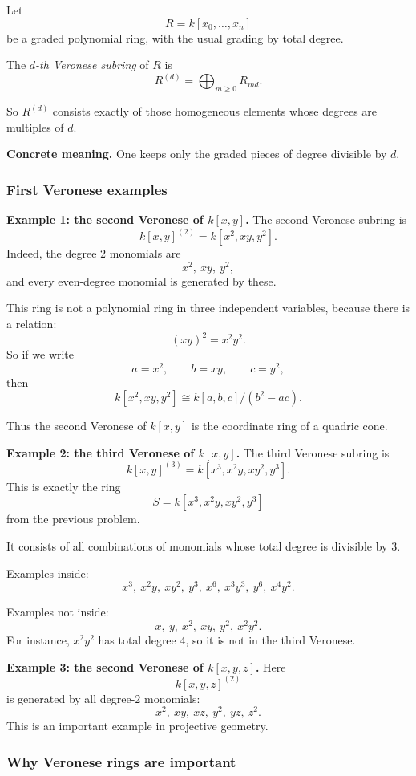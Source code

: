 \documentclass[12pt,a4paper]{article}
\theoremstyle{notespace}
\begin{document}
Let
\[
R=k[x_0,\dots,x_n]
\]
be a graded polynomial ring, with the usual grading by total degree.

The \emph{\(d\)-th Veronese subring} of \(R\) is
\[
R^{(d)}=\bigoplus_{m\ge 0} R_{md}.
\]

So \(R^{(d)}\) consists exactly of those homogeneous elements whose degrees are multiples of \(d\).

\medskip

\textbf{Concrete meaning.}
One keeps only the graded pieces of degree divisible by \(d\).

\subsubsection{First Veronese examples}

\textbf{Example 1: the second Veronese of \(k[x,y]\).}
The second Veronese subring is
\[
k[x,y]^{(2)}=k[x^2,xy,y^2].
\]
Indeed, the degree \(2\) monomials are
\[
x^2,\ xy,\ y^2,
\]
and every even-degree monomial is generated by these.

This ring is not a polynomial ring in three independent variables, because there is a relation:
\[
(xy)^2=x^2y^2.
\]
So if we write
\[
a=x^2,\qquad b=xy,\qquad c=y^2,
\]
then
\[
k[x^2,xy,y^2]\cong k[a,b,c]/(b^2-ac).
\]

Thus the second Veronese of \(k[x,y]\) is the coordinate ring of a quadric cone.

\medskip

\textbf{Example 2: the third Veronese of \(k[x,y]\).}
The third Veronese subring is
\[
k[x,y]^{(3)}=k[x^3,x^2y,xy^2,y^3].
\]
This is exactly the ring
\[
S=k[x^3,x^2y,xy^2,y^3]
\]
from the previous problem.

It consists of all combinations of monomials whose total degree is divisible by \(3\).

Examples inside:
\[
x^3,\ x^2y,\ xy^2,\ y^3,\ x^6,\ x^3y^3,\ y^6,\ x^4y^2.
\]

Examples not inside:
\[
x,\ y,\ x^2,\ xy,\ y^2,\ x^2y^2.
\]
For instance, \(x^2y^2\) has total degree \(4\), so it is not in the third Veronese.

\medskip

\textbf{Example 3: the second Veronese of \(k[x,y,z]\).}
Here
\[
k[x,y,z]^{(2)}
\]
is generated by all degree-\(2\) monomials:
\[
x^2,\ xy,\ xz,\ y^2,\ yz,\ z^2.
\]
This is an important example in projective geometry.

\subsubsection{Why Veronese rings are important}
\end{document}
